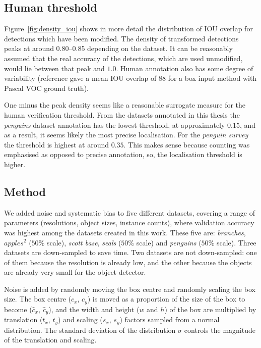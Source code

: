 \documentclass[conference]{IEEEtran}
\begin{document}
\subsection {Human threshold}


Figure~\ref{fig:density_iou} shows in more detail the distribution of \gls{IOU} overlap for detections which have been modified. The density of transformed detections peaks at around $0.80$--$0.85$ depending on the dataset. It can be reasonably assumed that the real accuracy of the detections, which are used unmodified, would lie between that peak and $1.0$. Human annotation also has some degree of variability (reference \cite{Papadopoulos2017} gave a mean \gls{IOU} overlap of 88 for a box input method with Pascal VOC ground truth).

One minus the peak density seems like a reasonable surrogate measure for the human verification threshold. From the datasets annotated in this thesis the \emph{penguins} dataset annotation has the lowest threshold, at approximately $0.15$, and as a result, it seems likely the most precise localisation. For the \emph{penguin survey} the threshold is highest at around $0.35$. This makes sense because counting was emphasised as opposed to precise annotation, so, the localisation threshold is higher. 


\subsection{Method}

We added noise and systematic bias to five different datasets, covering a range of parameters (resolutions, object sizes, instance counts), where validation accuracy was highest among the datasets created in this work. These five are: \emph{branches}, $apples^2$ ($50\%$ scale), \emph{scott base}, \emph{seals} ($50\%$ scale) and \emph{penguins} ($50\%$ scale). Three datasets are down-sampled to save time. Two datasets are not down-sampled: one of them because the resolution is already low, and the other because the objects are already very small for the object detector.

Noise is added by randomly moving the box centre and randomly scaling the box size. The box centre ($c_x$, $c_y$) is moved as a proportion of the size of the box to become ($\hat{c}_x$, $\hat{c}_y$), and the width and height ($w$ and $h$) of the box are multiplied by translation ($t_x$, $t_y$) and scaling ($s_x$, $s_y$) factors sampled from a normal distribution. The standard deviation of the distribution $\sigma$ controls the magnitude of the translation and scaling. 
\end{document}
